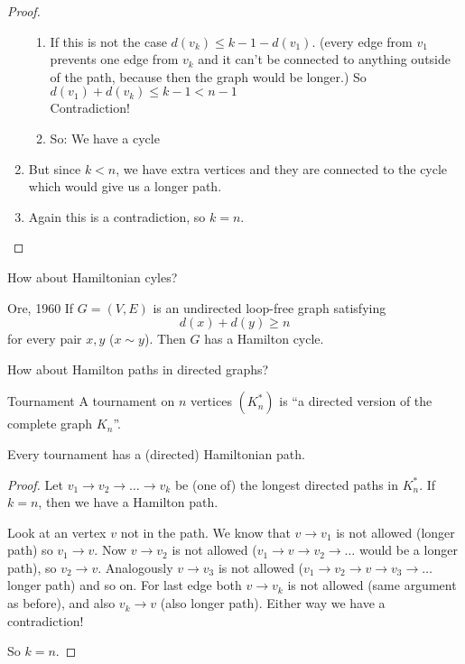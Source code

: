 \documentclass[english]{lbscript}
\begin{document}
\begin{proof}
\begin{enumerate}
\begin{enumerate}
			\item\label{item:39} If this is not the case \(d(v_k)≤ k-1 - d(v_1)\). (every edge from \(v_1\) prevents one edge from \(v_k\) and it can't be connected to anything outside of the path, because then the graph would be longer.) So \(d(v_1)+d(v_k)≤k-1<n-1\)\\
			Contradiction!
			\item\label{item:41} So: We have a cycle
		\end{enumerate}
		\item\label{item:40} But since \(k<n\), we have extra vertices and they are connected to the cycle which would give us a longer path.
		\item\label{item:42} Again this is a contradiction, so \(k=n\).
	\end{enumerate}
\end{proof}

How about Hamiltonian cyles?
\begin{theorem}{Ore, 1960}{}
	If \(G=(V,E)\) is an undirected loop-free graph satisfying
	\begin{equation}
		\label{eq:99}
		d(x)+d(y)≥n
	\end{equation}
	for every pair \(x,y\) (\(x\sim y\)). Then \(G\) has a Hamilton cycle.
\end{theorem}

How about Hamilton paths in directed graphs?
\begin{definition}{Tournament}{}
	A tournament on \(n\) vertices \((K_n^{*})\) is \enquote{a directed version of the complete graph \(K_n\)}.
\end{definition}

\begin{theorem}{}{}
	Every tournament has a (directed) Hamiltonian path.
\end{theorem}
\begin{proof}
	Let \(v_1→v_2→\dots→v_k\) be (one of) the longest directed paths in \(K_{n}^{*}\). If \(k=n\), then we have a Hamilton path.

	Look at an vertex \(v\) not in the path. We know that \(v→v_1\) is not allowed (longer path) so \(v_1→v\). Now \(v→v_2\) is not allowed (\(v_1→v→v_2→\dots\) would be a longer path), so \(v_2→v\). Analogously \(v→v_3\) is not allowed (\(v_1→v_2→v→v_3→\dots\) longer path) and so on. For last edge both \(v→v_k\) is not allowed (same argument as before), and also \(v_k→v\) (also longer path). Either way we have a contradiction!

	So \(k=n\).
\end{proof}
\end{document}
